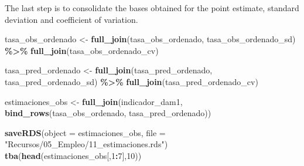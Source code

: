 \documentclass[
  12pt,
]{book}
\newenvironment{Shaded}{\begin{snugshade}}{\end{snugshade}}
\newcommand{\AttributeTok}[1]{\textcolor[rgb]{0.13,0.29,0.53}{#1}}
\newcommand{\DecValTok}[1]{\textcolor[rgb]{0.00,0.00,0.81}{#1}}
\newcommand{\FunctionTok}[1]{\textcolor[rgb]{0.13,0.29,0.53}{\textbf{#1}}}
\newcommand{\NormalTok}[1]{#1}
\newcommand{\OtherTok}[1]{\textcolor[rgb]{0.56,0.35,0.01}{#1}}
\newcommand{\SpecialCharTok}[1]{\textcolor[rgb]{0.81,0.36,0.00}{\textbf{#1}}}
\newcommand{\StringTok}[1]{\textcolor[rgb]{0.31,0.60,0.02}{#1}}
\begin{document}
\begin{Shaded}
\end{Shaded}

The last step is to consolidate the bases obtained for the point estimate, standard deviation and coefficient of variation.

\begin{Shaded}
\begin{Highlighting}[]
\NormalTok{tasa\_obs\_ordenado }\OtherTok{\textless{}{-}}
  \FunctionTok{full\_join}\NormalTok{(tasa\_obs\_ordenado, tasa\_obs\_ordenado\_sd) }\SpecialCharTok{\%\textgreater{}\%}
  \FunctionTok{full\_join}\NormalTok{(tasa\_obs\_ordenado\_cv)}

\NormalTok{tasa\_pred\_ordenado }\OtherTok{\textless{}{-}}
  \FunctionTok{full\_join}\NormalTok{(tasa\_pred\_ordenado, tasa\_pred\_ordenado\_sd) }\SpecialCharTok{\%\textgreater{}\%}
  \FunctionTok{full\_join}\NormalTok{(tasa\_pred\_ordenado\_cv)}


\NormalTok{estimaciones\_obs }\OtherTok{\textless{}{-}} \FunctionTok{full\_join}\NormalTok{(indicador\_dam1,}
                              \FunctionTok{bind\_rows}\NormalTok{(tasa\_obs\_ordenado, tasa\_pred\_ordenado))}



\FunctionTok{saveRDS}\NormalTok{(}\AttributeTok{object =}\NormalTok{ estimaciones\_obs, }\AttributeTok{file =} \StringTok{"Recursos/05\_Empleo/11\_estimaciones.rds"}\NormalTok{)}
\FunctionTok{tba}\NormalTok{(}\FunctionTok{head}\NormalTok{(estimaciones\_obs[,}\DecValTok{1}\SpecialCharTok{:}\DecValTok{7}\NormalTok{],}\DecValTok{10}\NormalTok{))}
\end{Highlighting}
\end{Shaded}
\end{document}
